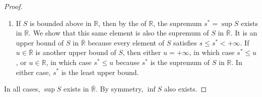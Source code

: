 \begin{proof}
\begin{enumerate}
\begin{enumerate}
            \item If $S$ is bounded above in $\mathbb{R}$, then by the  of $\mathbb{R}$, the supremum $s^* = \sup S$ exists in $\mathbb{R}$. We show that this same element is also the supremum of $S$ in $\overline{\mathbb{R}}$. It is an upper bound of $S$ in $\overline{\mathbb{R}}$ because every element of $S$ satisfies $s \leq s^* < +\infty$. If $u \in \overline{\mathbb{R}}$ is another upper bound of $S$, then either $u = +\infty$, in which case $s^* \leq u$, or $u \in \mathbb{R}$, in which case $s^* \leq u$ because $s^*$ is the supremum of $S$ in $\mathbb{R}$. In either case, $s^*$ is the least upper bound.
        \end{enumerate}
    \end{enumerate}

    In all cases, $\sup S$ exists in $\overline{\mathbb{R}}$. By symmetry, $\inf S$ also exists.
\end{proof}
